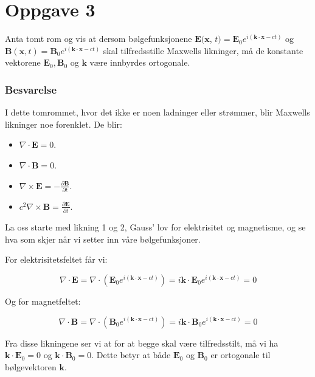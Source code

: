 \section{Oppgave 3}
Anta tomt rom og vis at dersom bølgefunksjonene  $\mathbf{E}(\mathbf{x}$, $t)=\mathbf{E}_{0} e^{i(\mathbf{k} \cdot \mathbf{x}-c t)}$  og  $\mathbf{B}(\mathbf{x}, t)=   \mathbf{B}_{0} e^{i(\mathbf{k} \cdot \mathbf{x}-c t)} $ skal tilfredsstille Maxwells likninger, må de konstante vektorene  $\mathbf{E}_{0}, \mathbf{B}_{0}$  og  $\mathbf{k}$  være innbyrdes ortogonale.

\subsubsection*{Besvarelse}

I dette tomrommet, hvor det ikke er noen ladninger eller strømmer, blir Maxwells likninger noe forenklet. De blir:

\begin{itemize}
    \item $\nabla \cdot \mathbf{E} = 0$.
    \item $\nabla \cdot \mathbf{B} = 0$.
    \item $\nabla \times \mathbf{E} = -\frac{\partial \mathbf{B}}{\partial t}$.
    \item $c^2 \nabla \times \mathbf{B} = \frac{\partial \mathbf{E}}{\partial t}$.
\end{itemize}

La oss starte med likning 1 og 2, Gauss' lov for elektrisitet og magnetisme, og se hva som skjer når vi setter inn våre bølgefunksjoner.

For elektrisitetsfeltet får vi:

\begin{equation*}
\nabla \cdot \mathbf{E} = \nabla \cdot (\mathbf{E}_0 e^{i(\mathbf{k} \cdot \mathbf{x}-ct)}) = i \mathbf{k} \cdot \mathbf{E}_0 e^{i(\mathbf{k} \cdot \mathbf{x}-ct)} = 0
\end{equation*}

Og for magnetfeltet:

\begin{equation*}
\nabla \cdot \mathbf{B} = \nabla \cdot (\mathbf{B}_0 e^{i(\mathbf{k} \cdot \mathbf{x}-ct)}) = i \mathbf{k} \cdot \mathbf{B}_0 e^{i(\mathbf{k} \cdot \mathbf{x}-ct)} = 0
\end{equation*}

Fra disse likningene ser vi at for at begge skal være tilfredsstilt, må vi ha $\mathbf{k} \cdot \mathbf{E}_0 = 0$ og $\mathbf{k} \cdot \mathbf{B}_0 = 0$. Dette betyr at både $\mathbf{E}_0$ og $\mathbf{B}_0$ er ortogonale til bølgevektoren $\mathbf{k}$.

